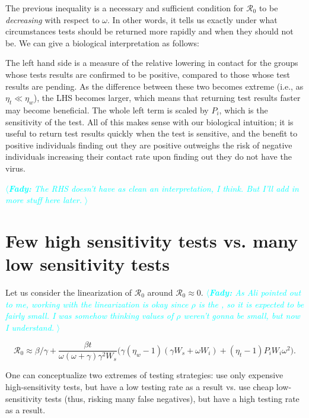 \documentclass{article}
\newcommand{\fady}[1]{\textcolor{cyan}{$\langle${\slshape{\bfseries Fady:} #1 }$\rangle$}}
\newcommand{\Rnum}{\mathcal{R}_0}
\begin{document}
The previous inequality is a necessary and sufficient condition for $\Rnum$ to be \emph{decreasing} with respect to $\omega$. In other words, it tells us exactly under what circumstances tests should be returned more rapidly and when they should not be. We can give a biological interpretation as follows:

The left hand side is a measure of the relative lowering in contact for the groups whose tests results are confirmed to be positive, compared to those whose test results are pending. As the difference between these two becomes extreme (i.e., as $\eta_t \ll \eta_{w}$), the LHS becomes larger, which means that returning test results faster may become beneficial. The whole left term is scaled by $P_i$, which is the sensitivity of the test. All of this makes sense with our biological intuition; it is useful to return test results quickly when the test is sensitive, and the benefit to positive individuals finding out they are positive outweighs the risk of negative individuals increasing their contact rate upon finding out they do not have the virus.

\fady{The RHS doesn't have as clean an interpretation, I think. But I'll add in more stuff here later.}

\section{Few high sensitivity tests vs. many low sensitivity tests}

Let us consider the linearization of $\Rnum$ around $\Rnum \approx 0$. \fady{As Ali pointed out to me, working with the linearization is okay since $\rho$ is the \text{daily per capita testing rate}, so it is expected to be fairly small. I was somehow thinking values of $\rho$ weren't gonna be small, but now I understand.}

\begin{equation}
\Rnum \approx \beta/\gamma + \frac{\beta t}{\omega (\omega+\gamma) \gamma^2 W_s} \Big(\gamma(\eta_w-1)(\gamma W_s+\omega W_i) + (\eta_t -1)P_iW_i \omega^2 \Big). 
\end{equation}

One can conceptualize two extremes of testing strategies: use only expensive high-sensitivity tests, but have a low testing rate as a result vs. use cheap low-sensitivity tests (thus, risking many false negatives), but have a high testing rate as a result. 
\end{document}
